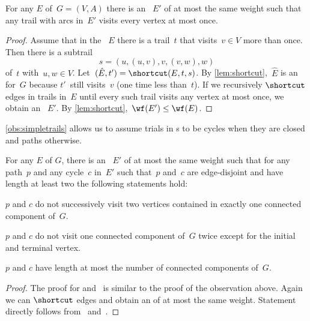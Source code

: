 \begin{observation}
  \label{obs:simpletrails}
  For any \EE{} $E$ of~$G=(V, A)$ there is an \EE{}~$E'$ of at most the same weight such that any trail with arcs in~$E'$ visits every vertex at most once.
\end{observation}
\begin{proof}
  Assume that in the \EE{}~$E$ there is a trail~$t$ that visits~$v \in V$ more than once. Then there is a subtrail~\[s = (u, (u,v), v, (v, w), w)\] of~$t$ with~$u, w \in V$. Let~$(\hat{E},t') = \shortcut(E, t, s)$. By \autoref{lem:shortcut},~$\hat{E}$ is an \EE{} for~$G$ because $t'$~still visits~$v$ (one time less than~$t$). If we recursively $\shortcut$ edges in trails in~$E$ until every such trail visits any vertex at most once, we obtain an \EE{}~$E'$. By \autoref{lem:shortcut},~$\wf(E') \leq \wf(E)$.
\end{proof}
\autoref{obs:simpletrails} allows us to assume trials in \EE s to be cycles when they are closed and paths otherwise.


\begin{observation}
  \label{obs:shorttrails}
  For any \EE{} $E$ of $G$, there is an \EE~$E'$ of at most the same weight such that for any path~$p$ and any cycle~$c$ in~$E'$ such that~$p$ and~$c$ are edge-disjoint and have length at least two the following statements hold: 
  \begin{lemenum}
  \item $p$ and $c$ do not successively visit two vertices contained in exactly one connected component of~$G$. \label{enu:osht1}
  \item $p$ and $c$ do not visit one connected component of~$G$ twice except for the initial and terminal vertex. \label{enu:osht2}
  \item $p$ and $c$ have length at most the number of connected components of~$G$. \label{enu:osht3}
  \end{lemenum}
\end{observation}
\begin{proof}
The proof for  and~ is similar to the proof of the observation above.  Again we can $\shortcut$ edges and obtain an \EE{} of at most the same weight. Statement~ directly follows from~ and~.
\end{proof}




